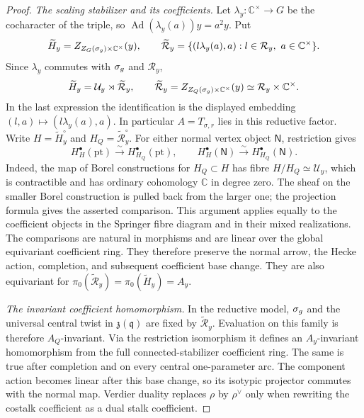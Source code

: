 \documentclass[10pt,a4paper]{amsart}
\begin{document}
\begin{proof}
\smallskip
\emph{The scaling stabilizer and its coefficients.}
Let $\lambda_y:\mathbb C^\times\to G$ be the cocharacter of the
triple, so $\operatorname{Ad}(\lambda_y(a))y=a^2y$.  Put
\[
 \widetilde H_y=Z_{Z_G(\sigma_{\rm g})\times\mathbb C^\times}(y),
 \qquad
 \widetilde{\mathcal R}_y
 =\{(l\lambda_y(a),a):l\in\mathcal R_y,\ a\in\mathbb C^\times\}.
\]
Since $\lambda_y$ commutes with $\sigma_{\rm g}$ and $\mathcal R_y$,
\[
 \widetilde H_y=\mathcal U_y\rtimes\widetilde{\mathcal R}_y,
 \qquad
 \widetilde{\mathcal R}_y
 =Z_{Z_Q(\sigma_{\rm g})\times\mathbb C^\times}(y)
 \simeq\mathcal R_y\times\mathbb C^\times.
\]
In the last expression the identification is the displayed embedding
$(l,a)\mapsto(l\lambda_y(a),a)$.
In particular $A=T_{\sigma,r}$ lies in this reductive factor.
Write $H=\widetilde H_y^\circ$ and
$H_Q=\widetilde{\mathcal R}_y^\circ$.
For either normal vertex object $\mathsf N$, restriction gives
\[
 H_H^\bullet(\mathrm{pt})\xrightarrow{\sim}
 H_{H_Q}^\bullet(\mathrm{pt}),\qquad
 H_H^\bullet(\mathsf N)\xrightarrow{\sim}
 H_{H_Q}^\bullet(\mathsf N).
\]
Indeed, the map of Borel constructions for $H_Q\subset H$ has
fibre $H/H_Q\simeq\mathcal U_y$, which is contractible and has
ordinary cohomology $\mathbb C$ in degree zero.  The sheaf on the
smaller Borel construction is pulled back from the larger one;
the projection formula gives the asserted comparison.  This
argument applies equally to the coefficient objects in the Springer
fibre diagram and in their mixed realizations.  The comparisons are
natural in morphisms and are linear over the global equivariant
coefficient ring.  They therefore preserve the normal arrow,
the Hecke action, completion, and subsequent coefficient base change.
They are also equivariant for
$\pi_0(\widetilde{\mathcal R}_y)=\pi_0(\widetilde H_y)=A_y$.

\smallskip
\emph{The invariant coefficient homomorphism.}
In the reductive model, $\sigma_{\rm g}$ and the universal central
twist in $\mathfrak z(\mathfrak q)$ are fixed by
$\widetilde{\mathcal R}_y$.  Evaluation on this family is therefore
$A_Q$-invariant.  Via the restriction isomorphism it defines an
$A_y$-invariant homomorphism from the full connected-stabilizer
coefficient ring.  The same is true after completion and on every
central one-parameter arc.  The component action becomes linear
after this base change, so its isotypic projector commutes with the
normal map.  Verdier duality replaces $\rho$ by $\rho^\vee$ only
when rewriting the costalk coefficient as a dual stalk coefficient.
\end{proof}
\end{document}
